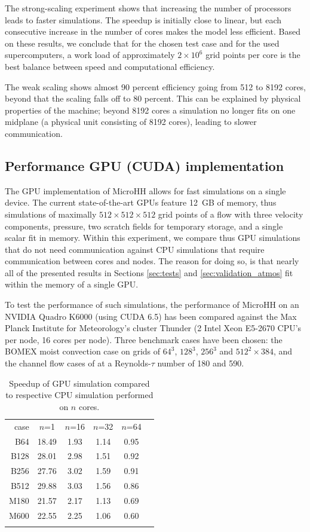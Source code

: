 \documentclass[gmd,manuscript]{copernicus}
\begin{document}
The strong-scaling experiment shows that increasing the number of processors leads to faster simulations. The speedup is initially close to linear, but each consecutive increase in the number of cores makes the model less efficient. Based on these results, we conclude that for the chosen test case and for the used supercomputers, a work load of approximately $2 \times 10^6$ grid points per core is the best balance between speed and computational efficiency.

The weak scaling shows almost 90 percent efficiency going from 512 to 8192 cores, beyond that the scaling falls off to 80 percent. This can be explained by physical properties of the machine;  beyond 8192 cores a simulation no longer fits on one midplane (a physical unit consisting of 8192 cores), leading to slower communication.

\subsection{Performance GPU (CUDA) implementation}
The GPU implementation of MicroHH allows for fast simulations on a single device. The current state-of-the-art GPUs feature 12~GB of memory, thus simulations of maximally $512 \times 512 \times 512$ grid points of a flow with three velocity components, pressure, two scratch fields for temporary storage, and a single scalar fit in memory. Within this experiment, we compare thus GPU simulations that do not need communication against CPU simulations that require communication between cores and nodes. The reason for doing so, is that nearly all of the presented results in Sections \ref{sec:tests} and \ref{sec:validation_atmos} fit within the memory of a single GPU.

To test the performance of such simulations, the performance of MicroHH on an NVIDIA Quadro K6000 (using CUDA 6.5) has been compared against the Max Planck Institute for Meteorology's cluster Thunder (2 Intel Xeon E5-2670 CPU's per node, 16 cores per node). Three benchmark cases have been chosen: the BOMEX moist convection case on grids of $64^3$, $128^3$, $256^3$ and $512^2 \times 384$, and the channel flow cases of \citet{Moser1999} at a Reynolds-$\tau$ number of 180 and 590.

\begin{table}[t]
	\caption{Speedup of GPU simulation compared to respective CPU simulation performed on $n$ cores.}\label{tab:gpu}
	\begin{tabular}{rccccc}
		\tophline
		case & $n$=1 & $n$=16 & $n$=32 & $n$=64   \\
		\middlehline
		B64  & 18.49 & 1.93 & 1.14 & 0.95 \\
		B128 & 28.01 & 2.98 & 1.51 & 0.92 \\
		B256 & 27.76 & 3.02 & 1.59 & 0.91 \\
		B512 & 29.88 & 3.03 & 1.56 & 0.86 \\
		\middlehline
		M180 & 21.57 & 2.17 & 1.13 & 0.69 \\
		M600 & 22.55 & 2.25 & 1.06 & 0.60 \\
		\bottomhline
	\end{tabular}
\end{table}
\end{document}
